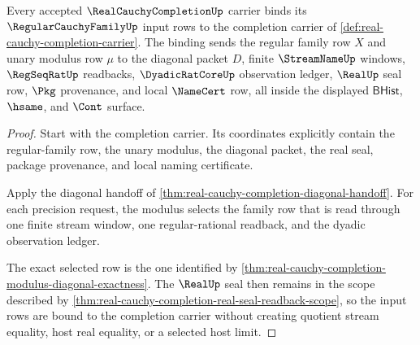 \begin{theorem}
\label{thm:real-cauchy-completion-regular-family-input-interface}
Every accepted $\RealCauchyCompletionUp$ carrier binds its $\RegularCauchyFamilyUp$ input rows to the completion carrier of \autoref{def:real-cauchy-completion-carrier}. The binding sends the regular family row $X$ and unary modulus row $\mu$ to the diagonal packet $D$, finite $\StreamNameUp$ windows, $\RegSeqRatUp$ readbacks, $\DyadicRatCoreUp$ observation ledger, $\RealUp$ seal row, $\Pkg$ provenance, and local $\NameCert$ row, all inside the displayed $\mathsf{BHist}$, $\hsame$, and $\Cont$ surface.
\end{theorem}
\begin{proof}
Start with the completion carrier. Its coordinates explicitly contain the regular-family row, the unary modulus, the diagonal packet, the real seal, package provenance, and local naming certificate.

Apply the diagonal handoff of \autoref{thm:real-cauchy-completion-diagonal-handoff}. For each precision request, the modulus selects the family row that is read through one finite stream window, one regular-rational readback, and the dyadic observation ledger.

The exact selected row is the one identified by \autoref{thm:real-cauchy-completion-modulus-diagonal-exactness}. The $\RealUp$ seal then remains in the scope described by \autoref{thm:real-cauchy-completion-real-seal-readback-scope}, so the input rows are bound to the completion carrier without creating quotient stream equality, host real equality, or a selected host limit.
\end{proof}

